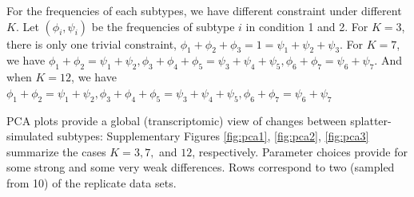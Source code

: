 \documentclass[aoas,preprint]{imsart}
\begin{document}
For the frequencies of each subtypes, we have different constraint under different $K$. 
Let $(\phi_i,\psi_i)$ be the frequencies of subtype $i$ in condition 1 and 2.
For $K = 3$, there is only one trivial constraint, $\phi_1 + \phi_2 + \phi_3 = 1 = \psi_1 + \psi_2 + \psi_3$.
For $K = 7$, we have $\phi_1 + \phi_2 = \psi_1 + \psi_2, \phi_3 + \phi_4 + \phi_5 = \psi_3 + \psi_4 + \psi_5, \phi_6 + \phi_7 = \psi_6 + \psi_7$.
And when $K = 12$, we have $\phi_1 + \phi_2 = \psi_1 + \psi_2, \phi_3 + \phi_4 + \phi_5 = \psi_3 + \psi_4 + \psi_5, \phi_6 + \phi_7 = \psi_6 + \psi_7$
 

PCA plots  provide a global (transcriptomic) view of 
 changes between splatter-simulated subtypes:  Supplementary Figures \ref{fig:pca1}, \ref{fig:pca2}, \ref{fig:pca3} summarize the cases $K=3, 7,$ and $12$, respectively.  Parameter choices provide for some
strong and some very weak differences.   Rows correspond to two (sampled from 10) of the replicate
data sets.

\end{document}
